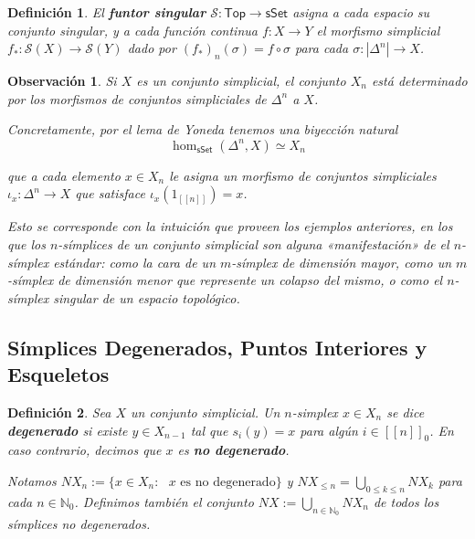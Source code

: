 \documentclass[11pt]{report}
\theoremstyle{colored}
\newtheorem{definition}{Definición}[section]
\newtheorem{remark}{Observación}[section]
\newcommand{\N}{\mathbb{N}}
\newcommand{\nat}[1]{[\![#1]\!]}
\newcommand{\ord}[1]{\nat{#1}}
\newcommand{\natzero}[1]{\nat{#1}_0}
\newcommand{\cat}[1]{\mathsf{#1}}
\renewcommand{\ss}[1]{\Delta^{#1}}
\begin{document}
\begin{definition} El \textbf{funtor singular} $\mathcal{S} : \cat{Top} \to \cat{sSet}$ asigna a cada espacio su conjunto singular, y a cada función continua $f : X \to Y$ el morfismo simplicial $f_* : \mathcal{S}(X) \to \mathcal{S}(Y)$ dado por $(f_*)_n(\sigma) =  f \circ \sigma$ para cada $\sigma: |\ss{n}| \to X$.
\end{definition}

\begin{remark} Si $X$ es un conjunto simplicial, el conjunto $X_n$ está determinado por los morfismos de conjuntos simpliciales de $\ss{n}$ a $X$. 

Concretamente, por el lema de Yoneda tenemos una biyección natural
\[
\hom_{\cat{sSet}}(\ss{n},X) \simeq X_n
\]

que a cada elemento $x \in X_n$ le asigna un morfismo de conjuntos simpliciales $\iota_x : \ss{n} \to X$ que satisface $\iota_x(1_{\ord{n}}) = x$. 

Esto se corresponde con la intuición que proveen los ejemplos anteriores, en los que los $n$-símplices de un conjunto simplicial son alguna «manifestación» de el $n$-símplex estándar: como la cara de un $m$-símplex de dimensión mayor, como un $m$-símplex de dimensión menor que represente un colapso del mismo, o como el $n$-símplex singular de un espacio topológico.\\
\end{remark}

\subsection{Símplices Degenerados, Puntos Interiores y Esqueletos}

\begin{definition} Sea $X$ un conjunto simplicial. Un $n$-simplex $x \in X_n$ se dice \textbf{degenerado} si existe $y \in X_{n-1}$ tal que $s_i(y) = x$ para algún $i \in \natzero{n}$. En caso contrario, decimos que $x$ es \textbf{no degenerado}. 

Notamos $NX_n := \{x \in X_n : \text{ $x$ es no degenerado}\}$ y $NX_{\leq n} = \bigcup_{0 \leq k \leq n}NX_k$ para cada $n \in \N_0$. Definimos también el conjunto $NX := \bigcup_{n \in \N_0}NX_n$ de todos los símplices no degenerados.
\end{definition}
\end{document}
